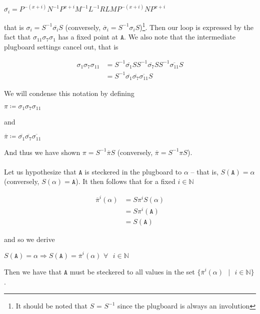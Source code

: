 \begin{center}
  $\overline{\sigma_i} =
  P^{-(x+i)}N^{-1}P^{x+i}M^{-1}L^{-1}RLMP^{-(x+i)}NP^{x+i}$
\end{center}
\noindent that is $\sigma_i = S^{-1}\overline{\sigma_i}S$
(conversely, $\overline\sigma_i = S^{-1}\sigma_iS$)\footnote{It
  should be noted that $S$ = $S^{-1}$ since the plugboard is always an
involution}.
Then our loop is expressed by the fact that
$\sigma_{11}\sigma_7\sigma_1$ has a fixed point at $\texttt{A}$.
We also note that the intermediate plugboard settings cancel out, that is
\begin{center}
  \begin{align*}
    \sigma_{1}\sigma_7\sigma_{11} & =
    S^{-1}\overline{\sigma_{1}}SS^{-1}\overline{\sigma_7}SS^{-1}\overline{\sigma_{11}}S
    \\&= S^{-1}
    \overline{\sigma_{1}}\overline{\sigma_7}\overline{\sigma_{11}}
    S
  \end{align*}
\end{center}
We will condense this notation by defining
\begin{center}
  $\pi \coloneq \sigma_{1}\sigma_7\sigma_{11}$
\end{center}
and
\begin{center}
  $\overline{\pi} \coloneq
  \overline{\sigma_{1}}\overline{\sigma_7}\overline{\sigma_{11}}$
\end{center}
And thus we have shown $\pi = S^{-1}\overline{\pi}S$ (conversely,
$\overline\pi = S^{-1}\pi S$).
\\\\Let us hypothesize that $\texttt{A}$ is steckered in the plugboard to
$\alpha$ -- that is, $S(\texttt{A}) = \alpha$ (conversely, $S(\alpha)
= \texttt{A}$).
It then follows that for a fixed $i\in\mathbb{N}$
\begin{center}
  \begin{align*}
    \overline{\pi}^i(\alpha) & = S\pi^i S(\alpha)
    \\&= S \pi^i(\texttt{A})
    \\&= S(\texttt{A})
  \end{align*}
\end{center}
and so we derive
\begin{center}
  $S(\texttt{A}) = \alpha \Rightarrow S(\texttt{A}) =
  \overline{\pi}^i(\alpha)\text{
  }\forall\text{ }i\in\mathbb{N}$
\end{center}
Then we have that $\texttt{A}$ must be steckered to all values in the set
$\{\overline{\pi}^i(\alpha)\text{ }\vert\text{ }i\in\mathbb{N}\}$.
